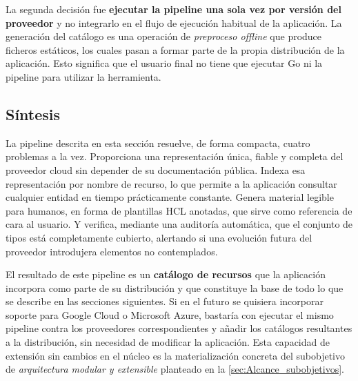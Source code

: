 \documentclass{article}
\begin{document}
{        \justify
        La segunda decisión fue \textbf{ejecutar la pipeline una sola vez por versión
        del proveedor} y no integrarlo en el flujo de ejecución habitual de la
        aplicación. La generación del catálogo es una operación de \textit{preproceso
        offline} que produce ficheros estáticos, los cuales pasan a formar parte de
        la propia distribución de la aplicación. Esto significa que el usuario final
        no tiene que ejecutar Go ni la pipeline para utilizar la herramienta.

        \subsection{Síntesis}
        \justify
        La pipeline descrita en esta sección resuelve, de forma compacta, cuatro
        problemas a la vez. Proporciona una representación única, fiable y completa
        del proveedor cloud sin depender de su documentación pública. Indexa esa
        representación por nombre de recurso, lo que permite a la aplicación consultar
        cualquier entidad en tiempo prácticamente constante. Genera material legible
        para humanos, en forma de plantillas HCL anotadas, que sirve como referencia
        de cara al usuario. Y verifica, mediante una auditoría automática, que el
        conjunto de tipos está completamente cubierto, alertando si una
        evolución futura del proveedor introdujera elementos no contemplados.

        \justify
        El resultado de este pipeline es un \textbf{catálogo de recursos} que la
        aplicación incorpora como parte de su distribución y que constituye la base de
        todo lo que se describe en las secciones siguientes. Si en
        el futuro se quisiera incorporar soporte para Google Cloud o Microsoft Azure,
        bastaría con ejecutar el mismo pipeline contra los proveedores
        correspondientes y añadir los catálogos resultantes a la distribución, sin
        necesidad de modificar la aplicación. Esta capacidad de extensión sin
        cambios en el núcleo es la materialización concreta del subobjetivo de
        \textit{arquitectura modular y extensible} planteado en la \ref{sec:Alcance_subobjetivos}.
        \par
    }


    \newpage
\end{document}
